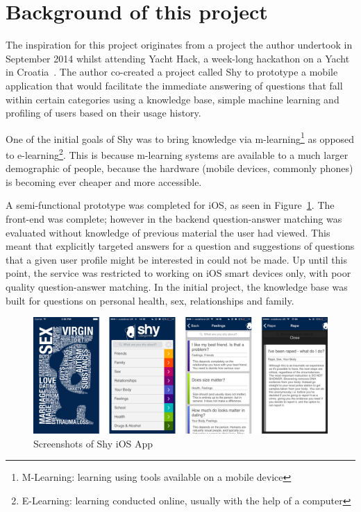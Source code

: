 \documentclass[authoryearcitations]{UoYCSproject}
\begin{document}

\section{Background of this project}

The inspiration for this project originates from a project the author undertook in September 2014 whilst attending Yacht Hack, a week-long hackathon on a Yacht in Croatia~\cite{yachtHack}.  The author co-created a project called Shy to prototype a mobile application that would facilitate the immediate answering of questions that fall within certain categories using a knowledge base, simple machine learning and profiling of users based on their usage history.

One of the initial goals of Shy was to bring knowledge via m-learning\footnote{M-Learning: learning using tools available on a mobile device} as opposed to e-learning\footnote{E-Learning: learning conducted online, usually with the help of a computer}.  This is because m-learning systems are available to a much larger demographic of people, because the hardware (mobile devices, commonly phones) is becoming ever cheaper and more accessible.

A semi-functional prototype was completed for iOS, as seen in Figure~\ref{fig:shy-ios-screenshots}.  The front-end was complete; however in the backend question-answer matching was evaluated without knowledge of previous material the user had viewed.  This meant that explicitly targeted answers for a question and suggestions of questions that a given user profile might be interested in could not be made.  Up until this point, the service was restricted to working on iOS smart devices only, with poor quality question-answer matching.  In the initial project, the knowledge base was built for questions on personal health, sex, relationships and family.

\begin{figure}[htb] 
\includegraphics[width=\linewidth]{shy-screenshots}
\caption{Screenshots of Shy iOS App}
\label{fig:shy-ios-screenshots}
\end{figure}
\end{document}
